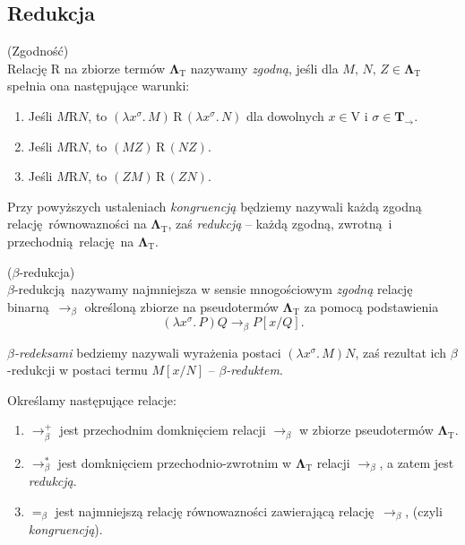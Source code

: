 \subsection{Redukcja}
\begin{definicja}(Zgodność)\\
  Relację \(\mathrm{R}\) na zbiorze termów \(\mathbf{\Lambda}_{\mathrm{T}}\) nazywamy \emph{zgodną}, jeśli dla \(M,\,N,\,Z\in\mathbf{\Lambda}_{\mathrm{T}}\) spełnia ona następujące warunki:
  \begin{enumerate}[label=\roman*)]
    \item Jeśli \(M\mathrm{R} N\), to \((\lambda x^\sigma.\,M)\, \mathrm{R}\, (\lambda x^\sigma.\, N)\) dla dowolnych \(x\in \mathrm{V}\) i \(\sigma\in \mathbf{T_\to}\).
    \item Jeśli \(M\mathrm{R} N\), to \((MZ)\,\mathrm{R}\, (NZ)\).
    \item Jeśli \(M\mathrm{R} N\), to \((ZM)\,\mathrm{R}\, (ZN)\).
  \end{enumerate}
Przy powyższych ustaleniach \emph{kongruencją} będziemy nazywali każdą zgodną relację równowazności na \(\mathbf{\Lambda}_{\mathrm{T}}\), zaś \emph{redukcją} – każdą zgodną, zwrotną i przechodnią relację na \(\mathbf{\Lambda}_{\mathrm{T}}\).
\end{definicja}

\begin{definicja}(\(\beta\)-redukcja)\\
  \(\beta\)-redukcją nazywamy najmniejsza w sensie mnogościowym \emph{zgodną} relację binarną \(\longrightarrow_{\beta}\) określoną zbiorze na pseudotermów \(\mathbf{\Lambda}_{\mathrm{T}}\) za pomocą podstawienia
  \[
    (\lambda x^\sigma.\,P)Q \longrightarrow_{\beta} P[x/Q].
  \]
  
  \noindent \emph{\(\beta\)-redeksami} bedziemy nazywali wyrażenia postaci \((\lambda x^\sigma.\, M)N\), zaś rezultat ich \(\beta\)-redukcji w postaci termu \(M[x/N]\) -- \emph{\(\beta\)-reduktem}.
\end{definicja}
\noindent Określamy następujące relacje:
\begin{enumerate}[label=B\arabic*.]
\item    \(\longrightarrow^{+}_{\beta}\) jest przechodnim domknięciem relacji \(\longrightarrow_{\beta}\) w zbiorze pseudotermów \(\mathbf{\Lambda}_{\mathrm{T}}\).

\item    \(\longrightarrow^{*}_{\beta}\) jest domknięciem przechodnio-zwrotnim w \(\mathbf{\Lambda}_{\mathrm{T}}\) relacji \(\longrightarrow_{\beta}\), a zatem jest \emph{redukcją}. 

\item    \(=_{\beta}\) jest najmniejszą relację równowazności zawierającą relację \(\longrightarrow_{\beta}\), (czyli \emph{kongruencją}).
\end{enumerate}

